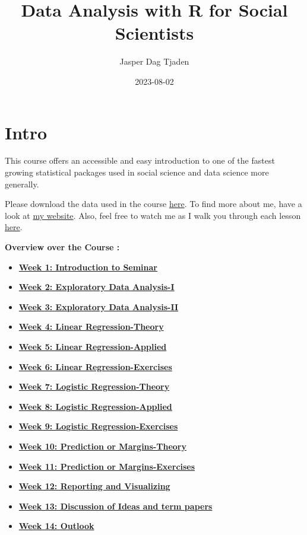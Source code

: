 \documentclass[
]{book}
\title{Data Analysis with R for Social Scientists}
\author{Jasper Dag Tjaden}
\date{2023-08-02}
\providecommand{\tightlist}{%
  \setlength{\itemsep}{0pt}\setlength{\parskip}{0pt}}
\begin{document}
\maketitle

{
\setcounter{tocdepth}{1}
\tableofcontents
}
\hypertarget{intro}{%
\chapter*{Intro}\label{intro}}

This course offers an accessible and easy introduction to one of the fastest growing statistical packages used in social science and data science more generally.

Please download the data used in the course \href{https://www.worldvaluessurvey.org/WVSDocumentationWV7.jsp}{here}. To find more about me, have a look at \href{https://jaspertjaden.com}{my website}. Also, feel free to watch me as I walk you through each lesson \href{https://www.youtube.com/playlist?list=PLr43hk2e3hFMg4tZdJsN0qzG5YkQB3A1c}{here}.

\textbf{Overview over the Course :}

\begin{itemize}
\tightlist
\item
  \textbf{\protect\hyperlink{intro-sem}{Week 1: Introduction to Seminar}}
\item
  \textbf{\protect\hyperlink{eda-1}{Week 2: Exploratory Data Analysis-I}}
\item
  \textbf{\protect\hyperlink{eda-2}{Week 3: Exploratory Data Analysis-II}}
\item
  \textbf{\protect\hyperlink{lin-t}{Week 4: Linear Regression-Theory}}
\item
  \textbf{\protect\hyperlink{lin-a}{Week 5: Linear Regression-Applied}}
\item
  \textbf{\protect\hyperlink{lin-e}{Week 6: Linear Regression-Exercises}}
\item
  \textbf{\protect\hyperlink{log-t}{Week 7: Logistic Regression-Theory}}
\item
  \textbf{\protect\hyperlink{log-a}{Week 8: Logistic Regression-Applied}}
\item
  \textbf{\protect\hyperlink{log-e}{Week 9: Logistic Regression-Exercises}}
\item
  \textbf{\protect\hyperlink{pm-t}{Week 10: Prediction or Margins-Theory}}
\item
  \textbf{\protect\hyperlink{pm-e}{Week 11: Prediction or Margins-Exercises}}
\item
  \textbf{\protect\hyperlink{report-v}{Week 12: Reporting and Visualizing}}
\item
  \textbf{\protect\hyperlink{dis-paper}{Week 13: Discussion of Ideas and term papers}}
\item
  \textbf{\protect\hyperlink{out-look}{Week 14: Outlook}}
\end{itemize}
\end{document}
